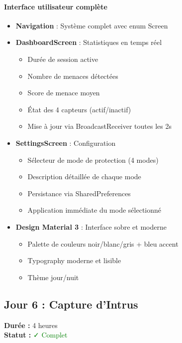 \documentclass[11pt,a4paper]{article}
\begin{document}
\paragraph{Interface utilisateur complète}
\begin{itemize}
    \item \textbf{Navigation} : Système complet avec enum Screen
    \item \textbf{DashboardScreen} : Statistiques en temps réel
    \begin{itemize}
        \item Durée de session active
        \item Nombre de menaces détectées
        \item Score de menace moyen
        \item État des 4 capteurs (actif/inactif)
        \item Mise à jour via BroadcastReceiver toutes les 2s
    \end{itemize}
    \item \textbf{SettingsScreen} : Configuration
    \begin{itemize}
        \item Sélecteur de mode de protection (4 modes)
        \item Description détaillée de chaque mode
        \item Persistance via SharedPreferences
        \item Application immédiate du mode sélectionné
    \end{itemize}
    \item \textbf{Design Material 3} : Interface sobre et moderne
    \begin{itemize}
        \item Palette de couleurs noir/blanc/gris + bleu accent
        \item Typography moderne et lisible
        \item Thème jour/nuit
    \end{itemize}
\end{itemize}

\subsection{Jour 6 : Capture d'Intrus}

\textbf{Durée :} 4 heures \\
\textbf{Statut :} \textcolor{green}{✓ Complet}
\end{document}
